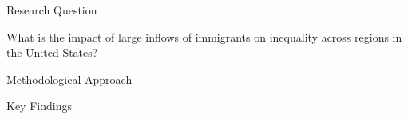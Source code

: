 \begin{frame}

    \begin{block}{Research Question}
    \end{block}
    What is the impact of large inflows of immigrants on inequality across regions in the United States?
    \begin{block}{Methodological Approach} 
    \end{block}
    
    \begin{block}{Key Findings} 
    \end{block}
    
\end{frame}
